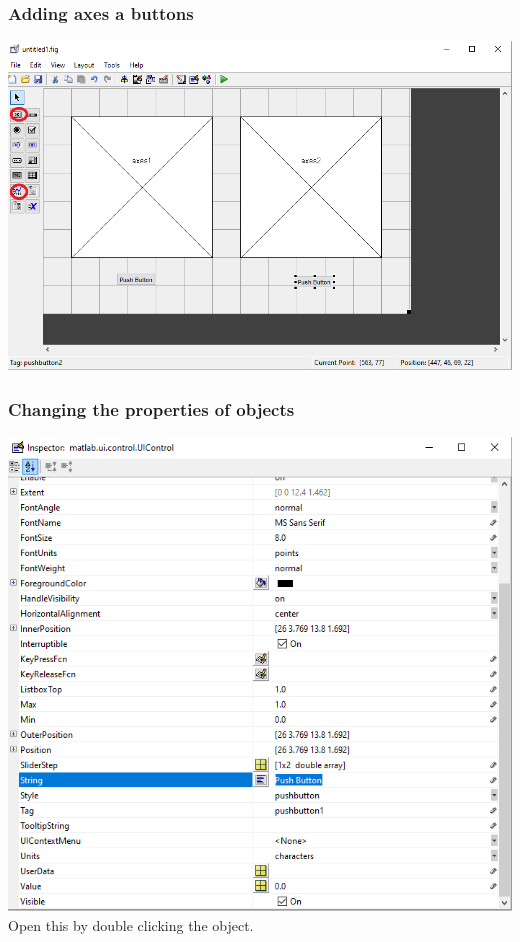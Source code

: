 \documentclass{beamer}
\begin{document}
\begin{frame}
  \frametitle{Adding axes a buttons}
  \centering
  \includegraphics[width=\textwidth, height=0.8\textheight,keepaspectratio]{screens/elements.png}
\end{frame}

\begin{frame}
  \frametitle{Changing the properties of objects}
  \centering
  \includegraphics[width=\textwidth, height=0.7\textheight,keepaspectratio]{screens/inspector.png}\\
    Open this by double clicking the object.
\end{frame}
\end{document}

